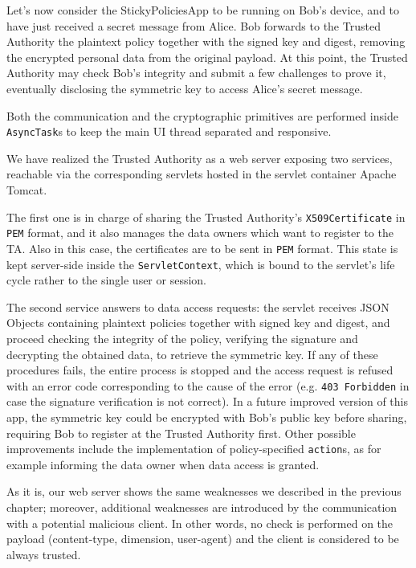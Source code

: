 Let's now consider the StickyPoliciesApp to be running on Bob's device, and to have just received a secret message from Alice. Bob forwards to the Trusted Authority the plaintext policy together with the signed key and digest, removing the encrypted personal data from the original payload. At this point, the Trusted Authority may check Bob's integrity and submit a few challenges to prove it, eventually disclosing the symmetric key to access Alice's secret message.

Both the communication and the cryptographic primitives are performed inside \texttt{AsyncTask}s to keep the main UI thread separated and responsive.

We have realized the Trusted Authority as a web server exposing two services, reachable via the corresponding servlets hosted in the servlet container Apache Tomcat.

The first one is in charge of sharing the Trusted Authority's \texttt{X509Certificate} in \texttt{PEM} format, and it also manages the data owners which want to register to the TA. Also in this case, the certificates are to be sent in \texttt{PEM} format. This state is kept server-side inside the \texttt{ServletContext}, which is bound to the servlet's life cycle rather to the single user or session.

The second service answers to data access requests: the servlet receives JSON Objects containing plaintext policies together with signed key and digest, and proceed checking the integrity of the policy, verifying the signature and decrypting the obtained data, to retrieve the symmetric key. If any of these procedures fails, the entire process is stopped and the access request is refused with an error code corresponding to the cause of the error (e.g. \texttt{403 Forbidden} in case the signature verification is not correct). In a future improved version of this app, the symmetric key could be encrypted with Bob's public key before sharing, requiring Bob to register at the Trusted Authority first. Other possible improvements include the implementation of policy-specified \texttt{action}s, as for example informing the data owner when data access is granted.

As it is, our web server shows the same weaknesses we described in the previous chapter; moreover, additional weaknesses are introduced by the communication with a potential malicious client. In other words, no check is performed on the payload (content-type, dimension, user-agent) and the client is considered to be always trusted.

